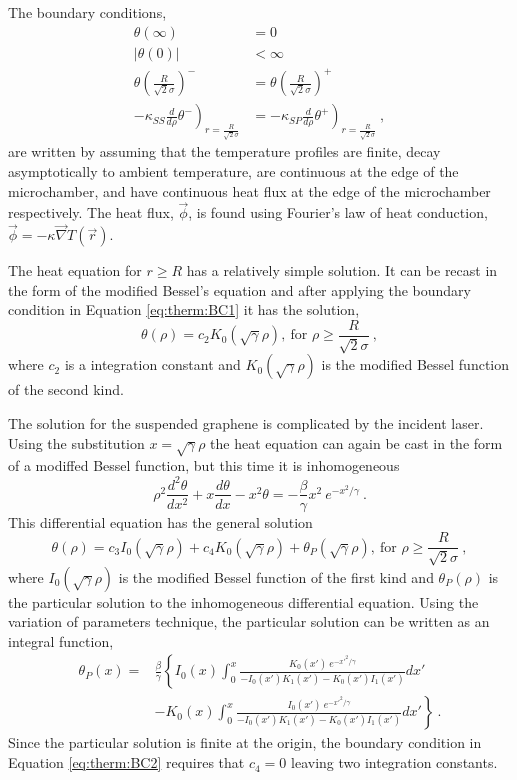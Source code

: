 The boundary conditions, 
\begin{align}
	\theta(\infty) &= 0 \label{eq:therm:BC1} \\
	|\theta(0)| &< \infty \label{eq:therm:BC2} \\
	\theta\left(\frac{R}{\sqrt{2} \sigma}\right)^- &= \theta\left(\frac{R}{\sqrt{2} \sigma}\right)^+ 
		\label{eq:therm:BC3} \\
	-\kappa_{SS} \left. \frac{d}{d\rho} \theta^- \right)_{r=\frac{R}{\sqrt{2} \sigma}}&=
	-\kappa_{SP} \left. \frac{d}{d\rho} \theta^+ \right)_{r=\frac{R}{\sqrt{2} \sigma}} \ , \label{eq:therm:BC4}
\end{align}
are written by assuming that the temperature profiles are finite, decay asymptotically to ambient temperature, are continuous at the edge of the microchamber, and have continuous heat flux at the edge of the microchamber respectively.
The heat flux, $\vec{\phi}$, is found using Fourier's law of heat conduction, $\vec{\phi}=-\kappa \vec{\nabla} T(\vec{r})$.

The heat equation for $r \geq R$ has a relatively simple solution.
It can be recast in the form of the modified Bessel's equation and after applying the boundary condition in Equation \ref{eq:therm:BC1} it has the solution,
\begin{equation}
	\theta(\rho)=c_2 K_0 (\sqrt{\gamma} \rho) , \ \textrm{for } \rho \geq \frac{R}{\sqrt{2} \sigma} \ ,
\end{equation}
where $c_2$ is a integration constant and $K_0 (\sqrt{\gamma} \rho)$ is the modified Bessel function of the second kind.

The solution for the suspended graphene is complicated by the incident laser.
Using the substitution $x=\sqrt{\gamma} \rho$ the heat equation can again be cast in the form of a modiffed Bessel function, but this time it is inhomogeneous
\begin{equation*}
	\rho^2 \frac{d^2 \theta}{d x^2}+x \frac{d \theta}{dx}-x^2 \theta = -\frac{\beta}{\gamma}x^2 \ e^{-x^2/\gamma} \ .
\end{equation*}
This differential equation has the general solution
\begin{equation*}
	\theta(\rho)=c_3 I_0(\sqrt{\gamma}\rho) + c_4 K_0(\sqrt{\gamma}\rho) + \theta_P(\sqrt{\gamma} \rho) , \ \textrm{for } \rho \geq \frac{R}{\sqrt{2} \sigma} \ ,
\end{equation*}
where $I_0 (\sqrt{\gamma} \rho)$ is the modified Bessel function of the first kind and $\theta_P (\rho)$ is the particular solution to the inhomogeneous differential equation.
Using the variation of parameters technique, the particular solution can be written as an integral function, 
\begin{align*}
	\theta_P (x)=&\frac{\beta}{\gamma} \left \{
	I_0 (x) \int_0^{x} 
		\frac{K_0(x') \ e^{-x'^2/\gamma} }{-I_0(x') K_1 (x')-K_0(x') I_1 (x')} dx' \right. \\
	&\left.-K_0 (x) \int_0^{x}
		\frac{I_0(x') \ e^{-x'^2/\gamma} }{-I_0(x') K_1 (x')-K_0(x') I_1 (x')} dx'
	\right \} \ .
\end{align*}
Since the particular solution is finite at the origin, the boundary condition in Equation \ref{eq:therm:BC2} requires that $c_4=0$ leaving two integration constants.

